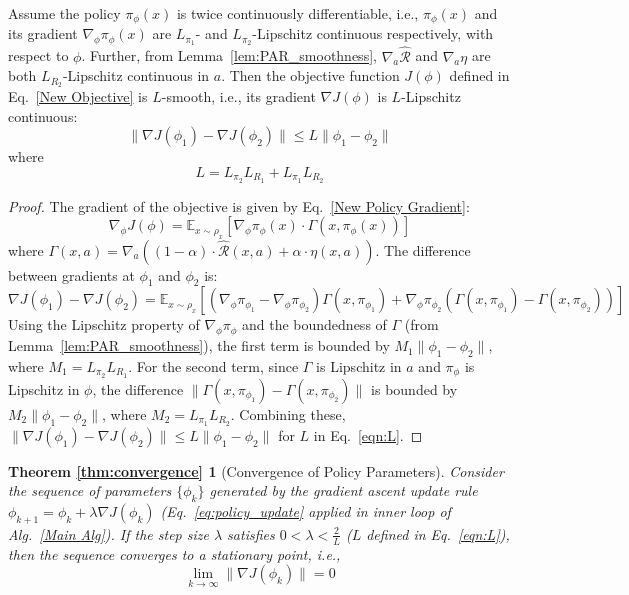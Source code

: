 \documentclass[./dissertation.tex]{subfiles}
\begin{document}
\begin{lemma}
Assume the policy $\pi_\phi(x)$ is twice continuously differentiable, i.e., $\pi_\phi(x)$ and its gradient $\nabla_\phi \pi_\phi(x)$ are $L_{\pi_1}$- and $L_{\pi_2}$-Lipschitz continuous respectively, with respect to $\phi$. Further, from Lemma~\ref{lem:PAR_smoothness}, $\nabla_a \hat{\mathcal{R}}$ and $\nabla_a \eta$ are both $L_{R_2}$-Lipschitz continuous in $a$. Then the objective function $J(\phi)$ defined in Eq.~\ref{New Objective} is $L$-smooth, i.e., its gradient $\nabla J(\phi)$ is $L$-Lipschitz continuous:
\[ \|\nabla J(\phi_1) - \nabla J(\phi_2)\| \leq L \|\phi_1 - \phi_2\| \]
where 
\begin{equation}
L = L_{\pi_2}L_{R_1} + L_{\pi_1}L_{R_2}
\label{eqn:L}
\end{equation}
\label{lem:J_smoothness}
\end{lemma}

\begin{proof}
The gradient of the objective is given by Eq.~\ref{New Policy Gradient}:
\[ \nabla_\phi J(\phi) = \mathbb{E}_{x \sim \rho_x} \left[ \nabla_\phi \pi_\phi(x) \cdot \Gamma(x, \pi_\phi(x)) \right] \]
where $\Gamma(x, a) = \nabla_a ((1-\alpha)\cdot\hat{\mathcal{R}}(x, a) + \alpha \cdot \eta(x, a))$. 
The difference between gradients at $\phi_1$ and $\phi_2$ is:
\[ \nabla J(\phi_1) - \nabla J(\phi_2) = \mathbb{E}_{x \sim \rho_x} \left[ (\nabla_\phi \pi_{\phi_1} - \nabla_\phi \pi_{\phi_2}) \Gamma(x, \pi_{\phi_1}) + \nabla_\phi \pi_{\phi_2} (\Gamma(x, \pi_{\phi_1}) - \Gamma(x, \pi_{\phi_2})) \right] \]
Using the Lipschitz property of $\nabla_\phi \pi_\phi$ and the boundedness of $\Gamma$ (from Lemma~\ref{lem:PAR_smoothness}), the first term is bounded by $M_1 \|\phi_1 - \phi_2\|$, where $M_1=L_{\pi_2}L_{R_1}$. For the second term, since $\Gamma$ is Lipschitz in $a$ and $\pi_\phi$ is Lipschitz in $\phi$, the difference $\|\Gamma(x, \pi_{\phi_1}) - \Gamma(x, \pi_{\phi_2})\|$ is bounded by $M_2 \|\phi_1 - \phi_2\|$, where $M_2=L_{\pi_1}L_{R_2}$. 
Combining these, $\|\nabla J(\phi_1) - \nabla J(\phi_2)\| \leq L \|\phi_1 - \phi_2\|$ for $L$ in Eq.~\ref{eqn:L}.
\end{proof}

\newtheorem*{repeatedThm2}{Theorem \ref{thm:convergence}}
\begin{repeatedThm2}[Convergence of Policy Parameters]
Consider the sequence of parameters $\{\phi_k\}$ generated by the gradient ascent update rule $\phi_{k+1} = \phi_k + \lambda \nabla J(\phi_k)$ (Eq.~\ref{eq:policy_update} applied in inner loop of Alg.~\ref{Main Alg}). If the step size $\lambda$ satisfies $0 < \lambda < \frac{2}{L}$ ($L$ defined in Eq.~\ref{eqn:L}), then the sequence converges to a stationary point, i.e.,
\[ \lim_{k \to \infty} \|\nabla J(\phi_k)\| = 0 \]
\end{repeatedThm2}
\end{document}
